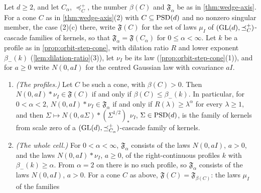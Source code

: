\begin{proposition}
\label{prop:wedge-axis-profiles}
\leanok
Let $d \ge 2$, and let $C_\alpha$, $\preceq^+_C$, the number $\beta(C)$ and $\mathfrak F_\alpha$ be as in
\ref{thm:wedge-axis}. For a cone $C$ as in \ref{thm:wedge-axis}(2) with $C \subseteq \mathrm{PSD}(d)$ and no nonzero
singular member, the case (2)(c) there, write $\mathfrak F(C)$ for the set of laws $\mu_I$ of
$(\mathrm{GL}(d), \preceq^+_C)$-cascade families of kernels, so that $\mathfrak F_\alpha = \mathfrak F(C_\alpha)$ for
$0 \le \alpha < \infty$. Let $k$ be a profile as in \ref{prop:orbit-step-cone}, with dilation
ratio $R$ and lower exponent $\beta_-(k)$ (\ref{lem:dilation-ratio}(3)), let $\nu_I$ be its law
(\ref{prop:orbit-step-cone}(1)), and for $a \ge 0$ write $N(0, aI)$ for the centred Gaussian law with
covariance $aI$.
\begin{enumerate}
\item \emph{(The profiles.)} Let $C$ be such a cone, with $\beta(C) > 0$. Then $N(0, aI) * \nu_I \in \mathfrak F(C)$
if and only if $\beta(C) \le \beta_-(k)$. In particular, for $0 < \alpha < 2$, $N(0, aI) * \nu_I \in \mathfrak F_\alpha$
if and only if $R(\lambda) \ge \lambda^\alpha$ for every $\lambda \ge 1$, and then
$\Sigma \mapsto N(0, a\Sigma) * (\Sigma^{1/2})_*\nu_I$, $\Sigma \in \mathrm{PSD}(d)$, is the family of kernels from scale
zero of a $(\mathrm{GL}(d), \preceq^+_{C_\alpha})$-cascade family of kernels.
\item \emph{(The whole cell.)} For $0 < \alpha < \infty$, $\mathfrak F_\alpha$ consists of the laws $N(0, aI)$, $a > 0$,
and the laws $N(0, aI) * \nu_I$, $a \ge 0$, of the right-continuous profiles $k$ with $\beta_-(k) \ge \alpha$.
From $\alpha = 2$ on there is no such profile, so $\mathfrak F_\alpha$ consists of the laws $N(0, aI)$, $a > 0$.
For a cone $C$ as above, $\mathfrak F(C) = \mathfrak F_{\beta(C)}$: the laws $\mu_I$ of the families

\end{enumerate}
\end{proposition}
